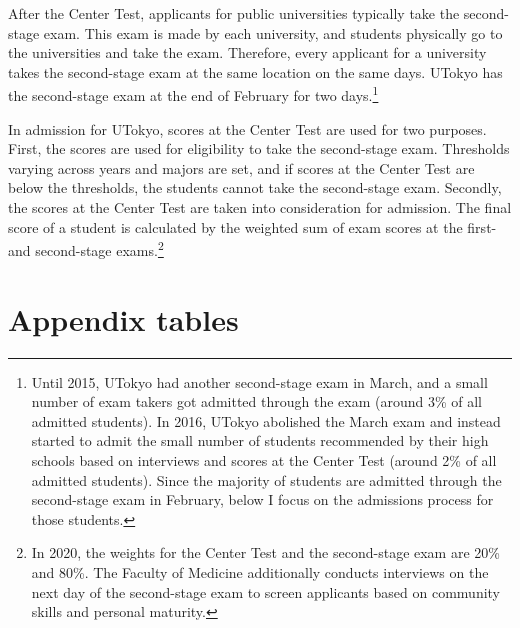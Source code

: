\documentclass[12pt,letterpaper]{article}
\begin{document}
After the Center Test, applicants for public universities typically take the second-stage exam.
This exam is made by each university, and students physically go to the universities and take the exam.
Therefore, every applicant for a university takes the second-stage exam at the same location on the same days.
UTokyo has the second-stage exam at the end of February for two days.\footnote{
  Until 2015, UTokyo had another second-stage exam in March, and a small number of exam takers got admitted through the exam (around 3\% of all admitted students).
  In 2016, UTokyo abolished the March exam and instead started to admit the small number of students recommended by their high schools based on interviews and scores at the Center Test (around 2\% of all admitted students).
  Since the majority of students are admitted through the second-stage exam in February, below I focus on the admissions process for those students. 
}

In admission for UTokyo, scores at the Center Test are used for two purposes.
First, the scores are used for eligibility to take the second-stage exam.
Thresholds varying across years and majors are set, and if scores at the Center Test are below the thresholds, the students cannot take the second-stage exam.
Secondly, the scores at the Center Test are taken into consideration for admission.
The final score of a student is calculated by the weighted sum of exam scores at the first- and second-stage exams.\footnote{
  In 2020, the weights for the Center Test and the second-stage exam are 20\% and 80\%.
  The Faculty of Medicine additionally conducts interviews on the next day of the second-stage exam to screen applicants based on community skills and personal maturity.
}



\setcounter{figure}{0}
\setcounter{table}{0}
\renewcommand\thefigure{\Alph{section}.\arabic{figure}}
\renewcommand\thetable{\Alph{section}.\arabic{table}}
  
\section{Appendix tables}\label{sec:appendix_table}
\end{document}

